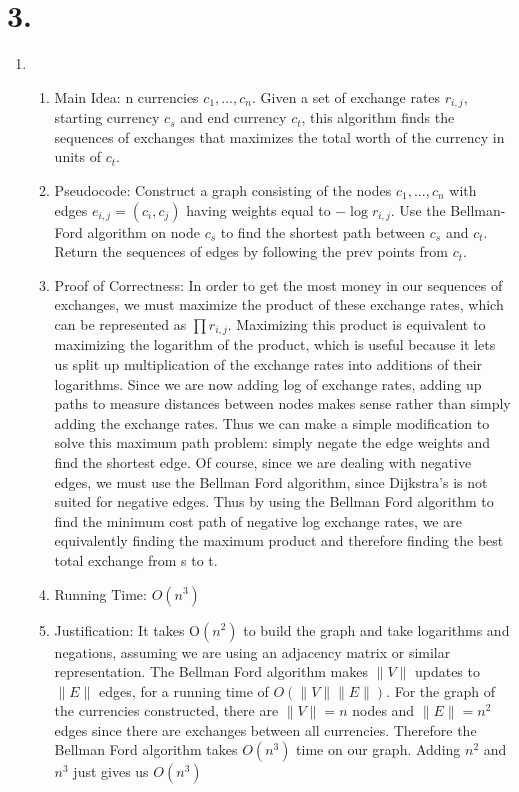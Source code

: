 \documentclass[11pt]{article}
\newenvironment{qparts}{\begin{enumerate}[{(}a{)}]}{\end{enumerate}}
\begin{document}
\section*{3.}
\begin{qparts}
\item
\begin{enumerate}
\item Main Idea: n currencies $c_1,...,c_n$. Given a set of exchange rates $r_{i,j}$, starting currency $c_s$ and end currency $c_t$, this algorithm finds the sequences of exchanges that maximizes the total worth of the currency in units of $c_t$. 
\item Pseudocode: Construct a graph consisting of the nodes $c_1,...,c_n$ with edges $e_{i,j}= (c_i, c_j)$ having weights equal to $- \log {r_{i,j}}$. Use the Bellman-Ford algorithm on node $c_s$ to find the shortest path between $c_s$ and $c_t$. Return the sequences of edges by following the prev points from $c_t$.
\item Proof of Correctness: In order to get the most money in our sequences of exchanges, we must maximize the product of these exchange rates, which can be represented as $\prod r_{i,j}$. Maximizing this product is equivalent to maximizing the logarithm of the product, which is useful because it lets us split up multiplication of the exchange rates into additions of their logarithms. Since we are now adding log of exchange rates, adding up paths to measure distances between nodes makes sense rather than simply adding the exchange rates. Thus we can make a simple modification to solve this maximum path problem: simply negate the edge weights and find the shortest edge. Of course, since we are dealing with negative edges, we must use the Bellman Ford algorithm, since Dijkstra's is not suited for negative edges. Thus by using the Bellman Ford algorithm to find the minimum cost path of negative log exchange rates, we are equivalently finding the maximum product and therefore finding the best total exchange from s to t.
\item Running Time: $O(n^3)$
\item Justification: It takes O$(n^2)$ to build the graph and take logarithms and negations, assuming we are using an adjacency matrix or similar representation. The Bellman Ford algorithm makes $\|V\|$ updates to $\|E\|$ edges, for a running time of $O(\|V\|\|E\|)$. For the graph of the currencies constructed, there are $\|V\|=n$ nodes and $\|E\|=n^2$ edges since there are exchanges between all currencies. Therefore the Bellman Ford algorithm takes $O(n^3)$ time on our graph. Adding $n^2$ and $n^3$ just gives us $O(n^3)$
\end{enumerate}


\end{qparts}
\end{document}
